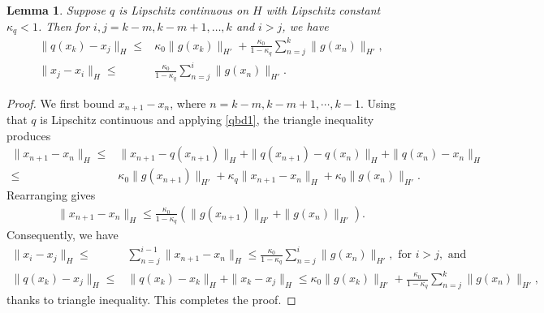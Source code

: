 \documentclass{article}
\numberwithin{equation}{section}
\newtheorem{lemma}[thm]{Lemma}
\begin{document}
\begin{lemma} 
\label{lemma0}
Suppose $q$ is Lipschitz continuous on $H$ with Lipschitz constant $\kappa_q<1$.  Then for $i,j = k-m, k-m+1, \dots, k$ and $i>j$, we have
    \begin{align*}
        \| q(x_k) - x_j\|_{H} \le& \kappa_0\|g(x_k)\|_{H'} + \frac{\kappa_0}{1-\kappa_q}\sum\limits_{n=j}^{k}\|g(x_{n})\|_{H'},\\
        \|x_j - x_i\|_{H} \le&  \frac{\kappa_0}{1-\kappa_q}\sum\limits_{n=j}^{i}\|g(x_{n})\|_{H'}.
    \end{align*}
\end{lemma}
\begin{proof}
We first bound $x_{n+1} -x_n$, where $n= k-m, k-m+1, \cdots, k-1.$  Using that $q$ is Lipschitz continuous and applying \eqref{qbd1}, the triangle inequality produces
    \begin{align*}
        \| x_{n+1} - x_n\|_{H} 
        \le & \|x_{n+1} - q(x_{n+1})\|_{H} + \| q(x_{n+1}) - q(x_n)\|_{H}+ \|q(x_n) - x_n\|_{H}
        \\
        \le & \kappa_0 \|g(x_{n+1})\|_{H'} + \kappa_q\|x_{n+1} - x_n\|_{H} + \kappa_0\|g(x_n)\|_{H'}.
        \end{align*}
Rearranging gives 
\begin{align*}
    \|x_{n+1} - x_n\|_{H} \le \frac{\kappa_0}{1-\kappa_q} (\|g(x_{n+1})\|_{H'}+\|g(x_{n})\|_{H'}).
\end{align*}
Consequently, we have 
   \begin{align*}
        \| x_i - x_j\|_{H} \le &  \sum\limits_{n=j}^{i-1} \| x_{n+1} - x_n\|_{H}
        \le \frac{\kappa_0}{1-\kappa_q}\sum\limits_{n=j}^{i}\|g(x_{n})\|_{H'}, \text{ for } i>j, \mbox{ and }
    \\
        \| q(x_k) - x_j\|_{H} \le &\|q(x_k) - x_k\|_{H} + \|x_k -x_j\|_{H}
        \le \kappa_0\|g(x_k)\|_{H'} + \frac{\kappa_0}{1-\kappa_q}\sum\limits_{n=j}^{k}\|g(x_{n})\|_{H'},
    \end{align*}
    thanks to triangle inequality.  This completes the proof.
\end{proof}
\end{document}
